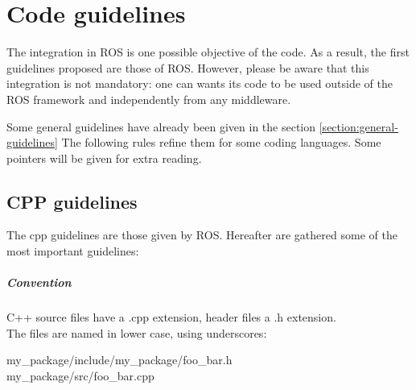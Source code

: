 \chapter{Code guidelines}


The integration in ROS is one possible objective of the code.
As a result,  the first guidelines proposed are those of ROS.
However, please be aware that this integration is not mandatory: one can wants its code to be used outside of the ROS framework and independently from any middleware.


Some general guidelines have already been given in the section \ref{section:general-guidelines}
The following rules refine them for some coding languages.
Some pointers will be given for extra reading.


\section{CPP guidelines}

The cpp guidelines are those given by ROS.
Hereafter are gathered some of the most important guidelines:

\paragraph{Convention}
C++ source files have a .cpp extension, header files a .h extension.\\
The files are named in lower case, using underscores:\\
\begin{tt}
my\_package/include/my\_package/foo\_bar.h\\
my\_package/src/foo\_bar.cpp\\
\end{tt}

